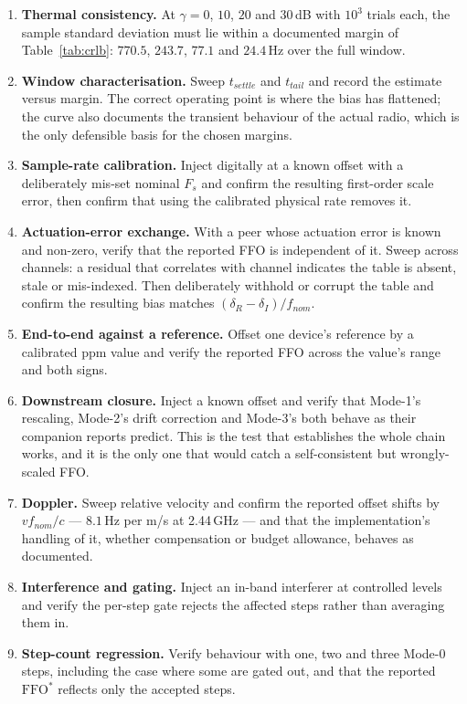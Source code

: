 \documentclass[11pt,a4paper]{article}
\newcommand{\FFO}{\mathrm{FFO}}
\begin{document}
\begin{enumerate}[leftmargin=1.7em,itemsep=2pt]
    implemented lag and confirm the wrap occurs exactly where predicted, and that the two-stage
    acquisition of Section~\ref{sec:estimators} prevents it. Include $\pm 24$\,ppm, the legitimate
    worst case for a compliant crystal pair.
  \item \textbf{Thermal consistency.} At $\gamma = 0$, $10$, $20$ and $30$\,dB with $10^3$ trials
    each, the sample standard deviation must lie within a documented margin of Table~\ref{tab:crlb}:
    $770.5$, $243.7$, $77.1$ and $24.4$\,Hz over the full window.
  \item \textbf{Window characterisation.} Sweep $t_{settle}$ and $t_{tail}$ and record the estimate
    versus margin. The correct operating point is where the bias has flattened; the curve also
    documents the transient behaviour of the actual radio, which is the only defensible basis for the
    chosen margins.
  \item \textbf{Sample-rate calibration.} Inject digitally at a known offset with a deliberately
    mis-set nominal $F_s$ and confirm the resulting first-order scale error, then confirm that using
    the calibrated physical rate removes it.
  \item \textbf{Actuation-error exchange.} With a peer whose actuation error is known and non-zero,
    verify that the reported FFO is independent of it. Sweep across channels: a residual that
    correlates with channel indicates the table is absent, stale or mis-indexed. Then deliberately
    withhold or corrupt the table and confirm the resulting bias matches
    $(\delta_R-\delta_I)/f_{nom}$.
  \item \textbf{End-to-end against a reference.} Offset one device's reference by a calibrated ppm
    value and verify the reported FFO across the value's range and both signs.
  \item \textbf{Downstream closure.} Inject a known offset and verify that Mode-1's rescaling,
    Mode-2's drift correction and Mode-3's both behave as their companion reports predict. This is the
    test that establishes the whole chain works, and it is the only one that would catch a
    self-consistent but wrongly-scaled FFO.
  \item \textbf{Doppler.} Sweep relative velocity and confirm the reported offset shifts by
    $v f_{nom}/c$ --- $8.1$\,Hz per m/s at 2.44\,GHz --- and that the implementation's handling of it,
    whether compensation or budget allowance, behaves as documented.
  \item \textbf{Interference and gating.} Inject an in-band interferer at controlled levels and
    verify the per-step gate rejects the affected steps rather than averaging them in.
  \item \textbf{Step-count regression.} Verify behaviour with one, two and three Mode-0 steps,
    including the case where some are gated out, and that the reported $\FFO^{*}$ reflects only the
    accepted steps.
\end{enumerate}
\end{document}

